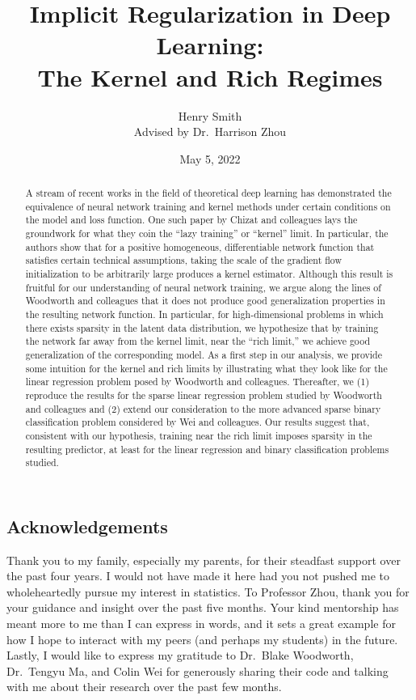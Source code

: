 \documentclass{article}
\title{\textbf{Implicit Regularization in Deep Learning:\\The Kernel and Rich Regimes}}
\author[]{Henry Smith\\
Advised by Dr.~Harrison Zhou}
\affil[]{\normalsize Department of Statistics \& Data Science\\Yale University}
\date{May 5, 2022}
\begin{document}
\maketitle

\begin{abstract}
\noindent
A stream of recent works in the field of theoretical deep learning has demonstrated the equivalence of neural network training and kernel methods under certain conditions on the model and loss function. One such paper by Chizat and colleagues lays the groundwork for what they coin the \enquote{lazy training} or \enquote{kernel} limit. In particular, the authors show that for a positive homogeneous, differentiable network function that satisfies certain technical assumptions, taking the scale of the gradient flow initialization to be arbitrarily large produces a kernel estimator. Although this result is fruitful for our understanding of neural network training, we argue along the lines of Woodworth and colleagues that it does not produce good generalization properties in the resulting network function. In particular, for high-dimensional problems in which there exists sparsity in the latent data distribution, we hypothesize that by training the network far away from the kernel limit, near the \enquote{rich limit,} we achieve good generalization of the corresponding model. As a first step in our analysis, we provide some intuition for the kernel and rich limits by illustrating what they look like for the linear regression problem posed by Woodworth and colleagues. Thereafter, we (1) reproduce the results for the sparse linear regression problem studied by Woodworth and colleagues and (2) extend our consideration to the more advanced sparse binary classification problem considered by Wei and colleagues. Our results suggest that, consistent with our hypothesis, training near the rich limit imposes sparsity in the resulting predictor, at least for the linear regression and binary classification problems studied.
\end{abstract}

\pagebreak

\vspace*{\fill}

\begin{centering}
\section*{Acknowledgements}
Thank you to my family, especially my parents, for their steadfast support over the past four years. I would not have made it here had you not pushed me to wholeheartedly pursue my interest in statistics. To Professor Zhou, thank you for your guidance and insight over the past five months. Your kind mentorship has meant more to me than I can express in words, and it sets a great example for how I hope to interact with my peers (and perhaps my students) in the future. Lastly, I would like to express my gratitude to Dr.~Blake Woodworth, Dr.~Tengyu Ma, and Colin Wei for generously sharing their code and talking with me about their research over the past few months.
\end{centering}
\end{document}
